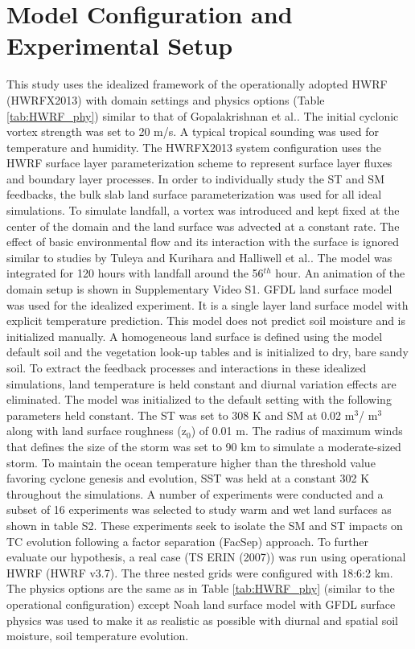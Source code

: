 \documentclass[fleqn,10pt]{wlscirep}
\begin{document}
\section*{Model Configuration and Experimental Setup}
This study uses the idealized framework of the operationally adopted HWRF (HWRFX2013) with domain settings and physics options (Table \ref{tab:HWRF_phy}) similar to that of Gopalakrishnan et al.\cite{Gopal2013}. The initial cyclonic vortex strength was set to 20 m/s. A typical tropical sounding\cite{Gray1975} was used for temperature and humidity. The HWRFX2013\cite{HWRFdoc2014} system configuration uses the HWRF surface layer parameterization scheme to represent surface layer fluxes and boundary layer processes. In order to individually study the ST and SM feedbacks, the bulk slab land surface parameterization was used for all ideal simulations. 
To simulate landfall, a vortex was introduced and kept fixed at the center of the domain and the land surface was advected at a constant rate. The effect of basic environmental flow and its interaction with the surface is ignored similar to studies by Tuleya and Kurihara\cite{tuleya1978} and Halliwell et al.\cite{Halliwell2015}. The model was integrated for 120 hours with landfall around the 56$^{th}$ hour. An animation of the domain setup is shown in Supplementary Video S1. GFDL land surface model was used for the idealized experiment. It is a single layer land surface model with explicit temperature prediction. This model does not predict soil moisture and is initialized manually. A homogeneous land surface is defined using the model default soil and the vegetation look-up tables and is initialized to dry, bare sandy soil. To extract the feedback processes and interactions in these idealized simulations, land temperature is held constant and diurnal variation effects are eliminated. The model was initialized to the default setting with the following parameters held constant. The ST was set to 308 K and SM at 0.02 m$^{3}$/ m$^{3}$ along with land surface roughness (z$_{0}$) of 0.01 m. The radius of maximum winds that defines the size of the storm was set to 90 km to simulate a moderate-sized storm. To maintain the ocean temperature higher than the threshold value favoring cyclone genesis and evolution, SST was held at a constant 302 K throughout the simulations. A number of experiments were conducted and a subset of 16 experiments was selected to study warm and wet land surfaces as shown in table S2. These experiments seek to isolate the SM and ST impacts on TC evolution following a factor separation (FacSep) approach\cite{SteinnAlpert1993}.  To further evaluate our hypothesis, a real case (TS ERIN (2007)) was run using operational HWRF (HWRF v3.7). The three nested grids were configured with 18:6:2 km. The physics options are the same as in Table \ref{tab:HWRF_phy} (similar to the operational configuration) except Noah land surface model with GFDL surface physics was used to make it as realistic as possible with diurnal and spatial soil moisture, soil temperature evolution.
\end{document}
